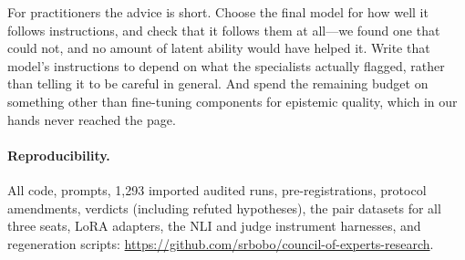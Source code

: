 \documentclass[11pt]{article}
\begin{document}
For practitioners the advice is short. Choose the final model for how well it
follows instructions, and check that it follows them at all---we found one
that could not, and no amount of latent ability would have helped it. Write
that model's instructions to depend on what the specialists actually flagged,
rather than telling it to be careful in general. And spend the remaining
budget on something other than fine-tuning components for epistemic quality,
which in our hands never reached the page.

\paragraph{Reproducibility.} All code, prompts, 1{,}293 imported audited runs, pre-registrations, protocol amendments, verdicts (including refuted hypotheses), the pair datasets for all three seats, LoRA adapters, the NLI and judge instrument harnesses, and regeneration scripts: \url{https://github.com/srbobo/council-of-experts-research}.

\appendix
\end{document}
